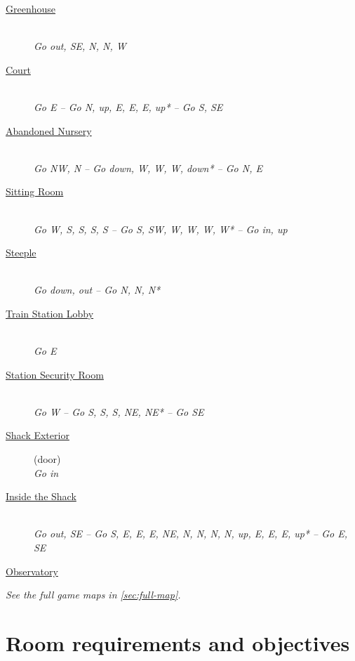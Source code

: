 \documentclass[a5paper]{extarticle}
\begin{document}
\newpage{}\label{sec:route-13}
\begin{description}
\item[{\hyperref[sec:req-Greenhouse]{Greenhouse}}] ~\\
  \emph{Go out, SE, N, N, W}
\item[{\hyperref[sec:req-Court]{Court}}] ~\\
  \emph{Go E -- Go N, up, E, E, E, up* -- Go S, SE}
\item[{\hyperref[sec:req-Abandoned-Nursery]{Abandoned Nursery}}] ~\\
  \emph{Go NW, N -- Go down, W, W, W, down* -- Go N, E}
\item[{\hyperref[sec:req-Sitting-Room]{Sitting Room}}] ~\\
  \emph{Go W, S, S, S, S -- Go S, SW, W, W, W, W* -- Go in, up}
\item[{\hyperref[sec:req-Steeple]{Steeple}}] ~\\
  \emph{Go down, out -- Go N, N, N*}
\item[{\hyperref[sec:req-Train-Station-Lobby]{Train Station Lobby}}] ~\\
  \emph{Go E}
\item[{\hyperref[sec:req-Station-Security-Room]{Station Security Room}}] ~\\
  \emph{Go W -- Go S, S, S, NE, NE* -- Go SE}
\item[{\hyperref[sec:req-Shack-Exterior]{Shack Exterior}}] (door)\\
  \emph{Go in}
\item[{\hyperref[sec:req-Inside-the-Shack]{Inside the Shack}}] ~\\
  \emph{Go out, SE -- Go S, E, E, E, NE, N, N, N, N, up, E, E, E, up* -- Go E, SE}
\item[{\hyperref[sec:req-Observatory]{Observatory}}]
\end{description}

\begin{center}
\emph{See the full game maps in \cref{sec:full-map}.}
\end{center}

\newpage
\section{Room requirements and objectives}\label{sec:sum}
\end{document}
